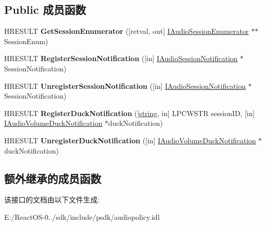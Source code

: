 \subsection*{Public 成员函数}
\begin{DoxyCompactItemize}
\item 
\mbox{\label{interface_i_audio_session_manager2_a8d3f4826088f780c174dd1e493df1ced}} 
H\+R\+E\+S\+U\+LT {\bfseries Get\+Session\+Enumerator} (\mbox{[}retval, out\mbox{]} \hyperlink{interface_i_audio_session_enumerator}{I\+Audio\+Session\+Enumerator} $\ast$$\ast$Session\+Enum)
\item 
\mbox{\label{interface_i_audio_session_manager2_a57efdc7c74e2f7962ce013a465b71965}} 
H\+R\+E\+S\+U\+LT {\bfseries Register\+Session\+Notification} (\mbox{[}in\mbox{]} \hyperlink{interface_i_audio_session_notification}{I\+Audio\+Session\+Notification} $\ast$Session\+Notification)
\item 
\mbox{\label{interface_i_audio_session_manager2_ab74cd97731d0df942a77b79e35c91661}} 
H\+R\+E\+S\+U\+LT {\bfseries Unregister\+Session\+Notification} (\mbox{[}in\mbox{]} \hyperlink{interface_i_audio_session_notification}{I\+Audio\+Session\+Notification} $\ast$Session\+Notification)
\item 
\mbox{\label{interface_i_audio_session_manager2_a01c4b7e6a6701c711c71239191a90028}} 
H\+R\+E\+S\+U\+LT {\bfseries Register\+Duck\+Notification} (\mbox{[}\hyperlink{structstring}{string}, in\mbox{]} L\+P\+C\+W\+S\+TR session\+ID, \mbox{[}in\mbox{]} \hyperlink{interface_i_audio_volume_duck_notification}{I\+Audio\+Volume\+Duck\+Notification} $\ast$duck\+Notification)
\item 
\mbox{\label{interface_i_audio_session_manager2_a8e9b46052f2d68ed578037be14b07e97}} 
H\+R\+E\+S\+U\+LT {\bfseries Unregister\+Duck\+Notification} (\mbox{[}in\mbox{]} \hyperlink{interface_i_audio_volume_duck_notification}{I\+Audio\+Volume\+Duck\+Notification} $\ast$duck\+Notification)
\end{DoxyCompactItemize}
\subsection*{额外继承的成员函数}


该接口的文档由以下文件生成\+:\begin{DoxyCompactItemize}
\item 
E\+:/\+React\+O\+S-\/0../sdk/include/psdk/audiopolicy.\+idl\end{DoxyCompactItemize}
